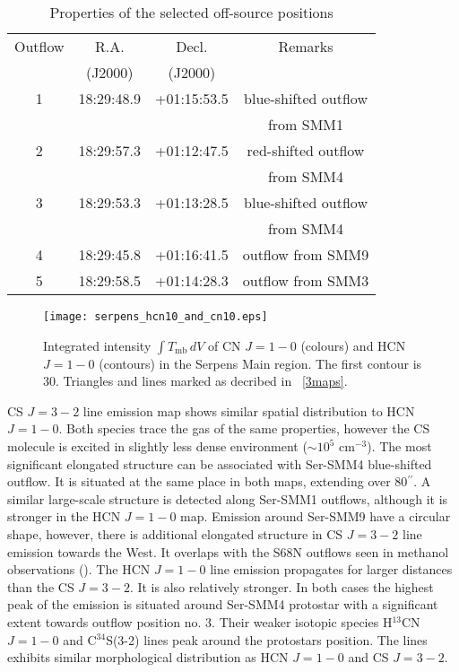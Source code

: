 \documentclass{aa}
\begin{document}
\begin{table}
\caption{Properties of the selected off-source positions}             %
\label{table:3}      %
\centering                          %
\begin{tabular}{c c c c} 
\hline\hline 
Outflow & R.A. & Decl. & Remarks\\
 & (J2000) & (J2000) & \\
\hline
1 & 18:29:48.9 & +01:15:53.5 & blue-shifted outflow \\
&&&from SMM1\\
2 & 18:29:57.3 & +01:12:47.5 & red-shifted outflow \\
&&&from SMM4\\
3 & 18:29:53.3 & +01:13:28.5 & blue-shifted outflow\\
&&&from SMM4\\
4 & 18:29:45.8 & +01:16:41.5 & outflow from SMM9 \\
5 & 18:29:58.5 & +01:14:28.3 & outflow from SMM3 \\
\hline
\end{tabular}
\end{table}


\begin{figure}
   \centering
   \texttt{[image: serpens\_hcn10\_and\_cn10.eps]}
      \caption{Integrated intensity $\int T_\mathrm{mb}\, dV$ of CN $J=1-0$ (colours) and HCN $J=1-0$ (contours) in the Serpens Main region. The first contour is 30. Triangles and lines marked as decribed in ~\ref{3maps}.}
         \label{cn10_and_hcn10}
   \end{figure}

CS $J=3-2$ line emission map shows similar spatial distribution to HCN $J=1-0$. Both species trace the gas of the same properties, however the CS molecule is excited in slightly less dense environment ($\sim 10^5$ cm$^{-3}$). The most significant elongated structure can be associated with Ser-SMM4 blue-shifted outflow. It is situated at the same place in both maps, extending over 80$^{\prime\prime}$. A similar large-scale structure is detected along Ser-SMM1 outflows, although it is stronger in the HCN $J=1-0$ map. Emission around Ser-SMM9 have a circular shape, however, there is additional elongated structure in CS $J=3-2$ line emission towards the West. It overlaps with the S68N outflows seen in methanol observations (\citealt{Kri10}). The HCN $J=1-0$  line emission propagates for larger distances than the CS $J=3-2$. It is also relatively stronger. In both cases the highest peak of the emission is situated around Ser-SMM4 protostar with a significant extent towards outflow position no. 3. Their weaker isotopic species H$^{13}$CN $J=1-0$ and \mbox{C$^{34}$S(3-2)} lines peak around the protostars position. The lines exhibits similar morphological distribution as HCN $J=1-0$ and CS $J=3-2$.
\end{document}
